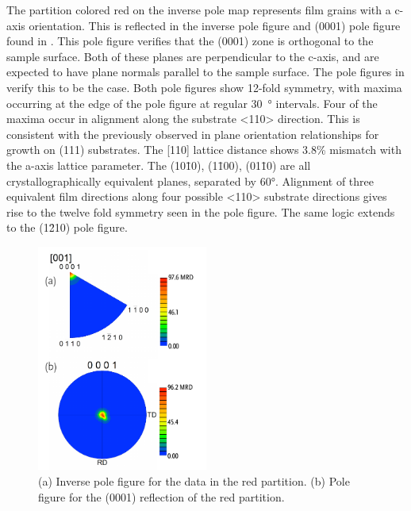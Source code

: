 The partition colored red on the inverse pole map represents film grains with a c-axis
orientation. This is reflected in the inverse pole figure and (0001) pole figure found in
. This pole figure verifies that the (0001) zone is orthogonal to the
sample surface. 
Both of these planes are perpendicular to the c-axis, and are expected to have plane
normals parallel to the sample surface. The pole figures in 
verify this to be the case. Both pole figures show 12-fold symmetry, with maxima occurring
at the edge of the pole figure at regular \SI{30}{\degree} intervals. Four of the maxima
occur in alignment along the substrate <110> direction. This is consistent with the
previously observed in plane orientation relationships for growth on (111)
substrates. The  [110] lattice distance shows 3.8\% mismatch with the
 a-axis lattice parameter. The (10\={1}0), (1\={1}00),  (01\={1}0) are all
crystallographically equivalent planes, separated by 60\si{\degree}. Alignment of three
equivalent film directions along four possible <110> substrate directions gives rise to
the twelve fold symmetry seen in the pole figure. The same logic extends to the (1\={2}10)
pole figure.
\begin{figure}
	\centering
	\includegraphics[width=0.5\textwidth]{red0001.pdf}
	\caption[Orientation analysis for red partition]{%
		(a) Inverse pole figure for the data in the red partition. (b) Pole 
		figure for the (0001) reflection of the red partition.}
	\label{fig:red0001}
\end{figure}
